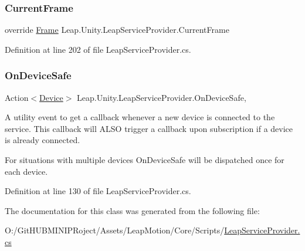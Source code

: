 \mbox{\label{class_leap_1_1_unity_1_1_leap_service_provider_ad651609e570c614c6d99de319ad990cd}} 
\subsubsection{\texorpdfstring{CurrentFrame}{CurrentFrame}}
{\footnotesize\ttfamily override \mbox{\hyperlink{class_leap_1_1_frame}{Frame}} Leap.\+Unity.\+Leap\+Service\+Provider.\+Current\+Frame\hspace{0.3cm}{\ttfamily [get]}}



Definition at line 202 of file Leap\+Service\+Provider.\+cs.

\mbox{\label{class_leap_1_1_unity_1_1_leap_service_provider_a3d7b925adafada59a54fd28c53a7f86d}} 
\subsubsection{\texorpdfstring{OnDeviceSafe}{OnDeviceSafe}}
{\footnotesize\ttfamily Action$<$\mbox{\hyperlink{class_leap_1_1_device}{Device}}$>$ Leap.\+Unity.\+Leap\+Service\+Provider.\+On\+Device\+Safe\hspace{0.3cm}{\ttfamily [add]}, {\ttfamily [remove]}}



A utility event to get a callback whenever a new device is connected to the service. This callback will A\+L\+SO trigger a callback upon subscription if a device is already connected. 

For situations with multiple devices On\+Device\+Safe will be dispatched once for each device. 

Definition at line 130 of file Leap\+Service\+Provider.\+cs.



The documentation for this class was generated from the following file\+:\begin{DoxyCompactItemize}
\item 
O\+:/\+Git\+H\+U\+B\+M\+I\+N\+I\+P\+Roject/\+Assets/\+Leap\+Motion/\+Core/\+Scripts/\mbox{\hyperlink{_leap_service_provider_8cs}{Leap\+Service\+Provider.\+cs}}\end{DoxyCompactItemize}
